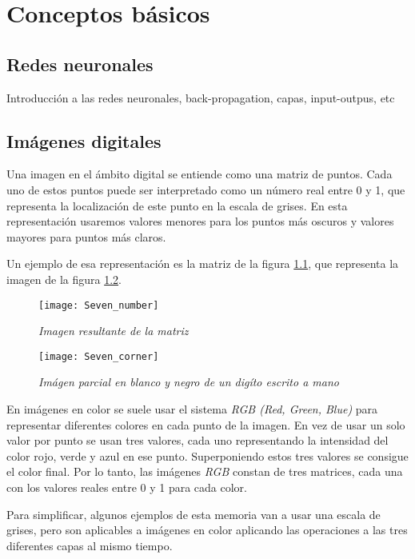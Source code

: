 \chapter{Conceptos básicos}

\label{BasicConcepts}

\section{Redes neuronales}
Introducción a las redes neuronales, back-propagation, capas, input-outpus, etc


\section{Imágenes digitales}

Una imagen en el ámbito digital se entiende como una matriz de puntos.
Cada uno de estos puntos puede ser interpretado como un número real entre 0 y 1, que representa la localización de este punto en la escala de grises. En esta representación usaremos valores menores para los puntos más oscuros y valores mayores para puntos más claros.

Un ejemplo de esa representación es la matriz de la figura \ref{Seven_number}, que representa la imagen de la figura \ref{Seven_corner}.

\begin{figure}
    \centering
    \caption{\textit{Imagen resultante de la matriz}}
  \label{Seven_number}
  \texttt{[image: Seven\_number]}
\end{figure}

\begin{figure}
    \centering
    \caption{\textit{Imágen parcial en blanco y negro de un digíto escrito a mano}}
  \label{Seven_corner}
  \texttt{[image: Seven\_corner]}
\end{figure}

En imágenes en color se suele usar el sistema \textit{RGB (Red, Green, Blue)} para representar diferentes colores en cada punto de la imagen. En vez de usar un solo valor por punto se usan tres valores, cada uno representando la intensidad del color rojo, verde y azul en ese punto. Superponiendo estos tres valores se consigue el color final. Por lo tanto, las imágenes \textit{RGB} constan de tres matrices, cada una con los valores reales entre 0 y 1 para cada color.

Para simplificar, algunos ejemplos de esta memoria van a usar una escala de grises, pero son aplicables a imágenes en color aplicando las operaciones a las tres diferentes capas al mismo tiempo.

